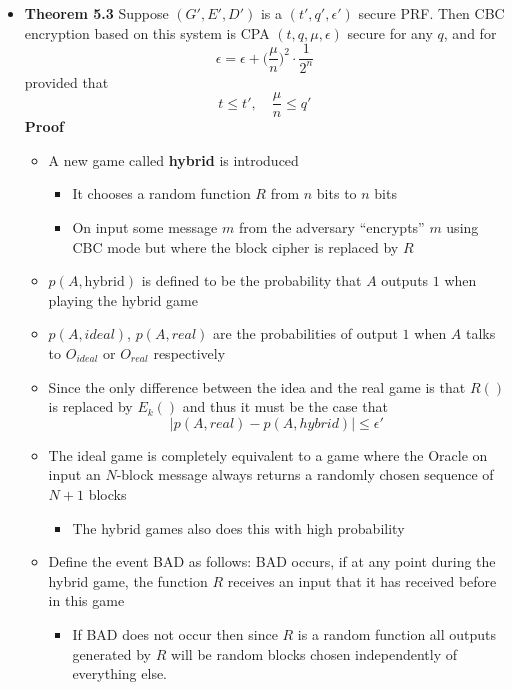\begin{itemize}
  \item \textbf{Theorem 5.3} Suppose $(G',E',D')$ is a $(t',q', \epsilon')$ secure PRF. Then CBC encryption based on this system is CPA $(t,q,\mu,\epsilon)$ secure for any $q$, and for
  \begin{equation*}
    \epsilon = \epsilon + \bigg(\frac{\mu}n\bigg)^2 \cdot \frac1{2^n}
  \end{equation*}
  provided that
  \begin{equation*}
    t \leq t', \quad \frac\mu{n} \leq q'
  \end{equation*}
  \textbf{Proof}
  \begin{itemize}
  	\item A new game called \textbf{hybrid} is introduced
    \begin{itemize}
    	\item It chooses a random function $R$ from $n$ bits to $n$ bits 
      \item On input some message $m$ from the adversary ``encrypts'' $m$ using CBC mode but where the block cipher is replaced by $R$
    \end{itemize} 
    \item $p(A, \text{hybrid})$ is defined to be the probability that $A$ outputs $1$ when playing the hybrid game
    \item $p(A, ideal)$, $p(A, real)$ are the probabilities of output $1$ when $A$ talks to $O_{ideal}$ or $O_{real}$ respectively
    \item Since the only difference between the idea and the real game is that $R()$ is replaced by $E_k()$ and thus it must be the case that 
    \begin{equation*}
      |p(A, real) - p(A, hybrid) | \leq \epsilon '
    \end{equation*}
    \item The ideal game is completely equivalent to a game where the Oracle on input an $N$-block message always returns a randomly chosen sequence of $N+1$ blocks
    \begin{itemize}
    	\item The hybrid games also does this with high probability
    \end{itemize}
    \item Define the event BAD as follows: BAD occurs, if at any point during the hybrid game, the function $R$ receives an input that it has received before in this game
    \begin{itemize}
    	\item If BAD does not occur then since $R$ is a random function all outputs generated by $R$ will be random blocks chosen independently of everything else.

\end{itemize}
\end{itemize}
\end{itemize}
